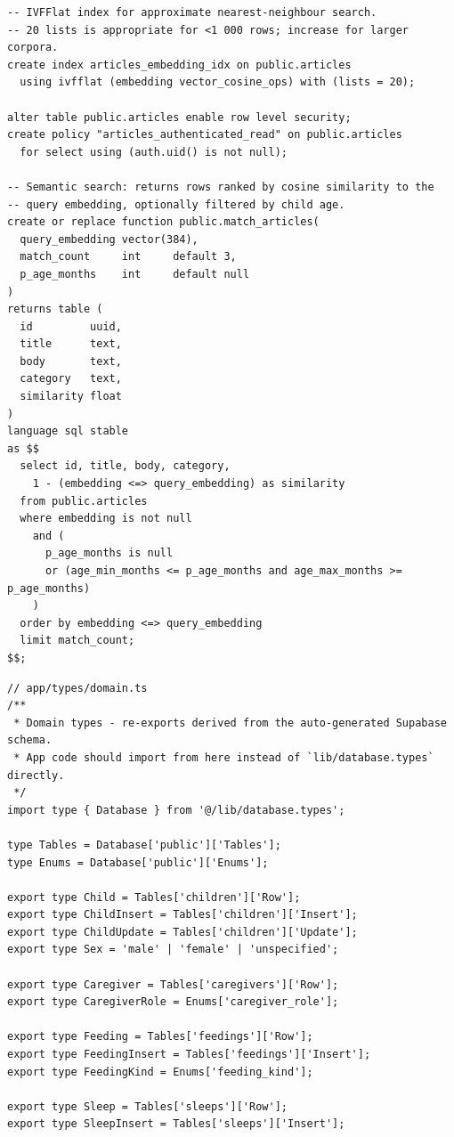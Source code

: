 \documentclass[%
  ukrainian, utf8, columnvii, simple,
  hpadding=10mm, vpadding=10mm, reduceheight=2mm,
  floatsection,
]{eskdtext}
\begin{document}
{\begin{verbatim}
-- IVFFlat index for approximate nearest-neighbour search.
-- 20 lists is appropriate for <1 000 rows; increase for larger corpora.
create index articles_embedding_idx on public.articles
  using ivfflat (embedding vector_cosine_ops) with (lists = 20);

alter table public.articles enable row level security;
create policy "articles_authenticated_read" on public.articles
  for select using (auth.uid() is not null);

-- Semantic search: returns rows ranked by cosine similarity to the
-- query embedding, optionally filtered by child age.
create or replace function public.match_articles(
  query_embedding vector(384),
  match_count     int     default 3,
  p_age_months    int     default null
)
returns table (
  id         uuid,
  title      text,
  body       text,
  category   text,
  similarity float
)
language sql stable
as $$
  select id, title, body, category,
    1 - (embedding <=> query_embedding) as similarity
  from public.articles
  where embedding is not null
    and (
      p_age_months is null
      or (age_min_months <= p_age_months and age_max_months >= p_age_months)
    )
  order by embedding <=> query_embedding
  limit match_count;
$$;
\end{verbatim}

\begin{verbatim}
// app/types/domain.ts
/**
 * Domain types - re-exports derived from the auto-generated Supabase schema.
 * App code should import from here instead of `lib/database.types` directly.
 */
import type { Database } from '@/lib/database.types';

type Tables = Database['public']['Tables'];
type Enums = Database['public']['Enums'];

export type Child = Tables['children']['Row'];
export type ChildInsert = Tables['children']['Insert'];
export type ChildUpdate = Tables['children']['Update'];
export type Sex = 'male' | 'female' | 'unspecified';

export type Caregiver = Tables['caregivers']['Row'];
export type CaregiverRole = Enums['caregiver_role'];

export type Feeding = Tables['feedings']['Row'];
export type FeedingInsert = Tables['feedings']['Insert'];
export type FeedingKind = Enums['feeding_kind'];

export type Sleep = Tables['sleeps']['Row'];
export type SleepInsert = Tables['sleeps']['Insert'];


\end{verbatim}}
\end{document}

